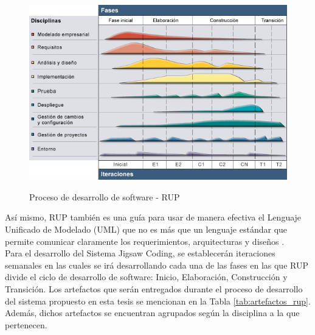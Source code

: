 \begin{figure}[!h]
  \centering
  \includegraphics[scale=0.7]{figuras/rup.jpg}\\
  \caption[RUP]{Proceso de desarrollo de software - RUP \protect\cite{rup_small}}\label{fig:rup}
\end{figure}

Así mismo, RUP también es una guía para usar de manera efectiva el Lenguaje Unificado de Modelado (UML) que no es más que un lenguaje estándar que permite comunicar claramente los requerimientos, arquitecturas y diseños \cite{rup_ibm_2014}.\\

Para el desarrollo del Sistema Jigsaw Coding, se establecerán iteraciones semanales en las cuales se irá desarrollando cada una de las fases en las que RUP divide el ciclo de desarrollo de software: Inicio, Elaboración, Construcción y Transición. Los artefactos que serán entregados durante el proceso de desarrollo del sistema propuesto en esta tesis se mencionan en la Tabla \ref{tab:artefactos_rup}. Además, dichos artefactos se encuentran agrupados según la disciplina a la que pertenecen.

